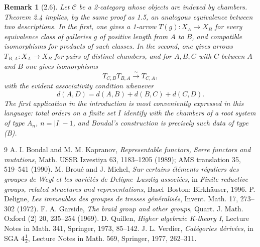 \documentclass[11pt]{article}
\newtheorem{remark}[theorem]{Remark}
\begin{document}
\begin{remark}[2.6]
Let $\mathcal C$ be a 2-category whose objects are indexed by chambers. Theorem 2.4 implies, by the same proof as 1.5, an analogous equivalence between two descriptions. In the first, one gives a 1-arrow $T(g):X_A\to X_B$ for every equivalence class of galleries $g$ of positive length from $A$ to $B$, and compatible isomorphisms for products of such classes. In the second, one gives arrows $T_{B,A}:X_A\to X_B$ for pairs of distinct chambers, and for $A,B,C$ with $C$ between $A$ and $B$ one gives isomorphisms
\[
T_{C,B}T_{B,A}\xrightarrow{\sim}T_{C,A},
\]
with the evident associativity condition whenever
\[
d(A,D)=d(A,B)+d(B,C)+d(C,D).
\]
The first application in the introduction is most conveniently expressed in this language: total orders on a finite set $I$ identify with the chambers of a root system of type $A_n$, $n=|I|-1$, and Bondal's construction is precisely such data of type (B).
\end{remark}

\begin{thebibliography}{9}
 A. I. Bondal and M. M. Kapranov, \emph{Representable functors, Serre functors and mutations}, Math. USSR Izvestiya 63, 1183--1205 (1989); AMS translation 35, 519--541 (1990).
 M. Broué and J. Michel, \emph{Sur certains éléments réguliers des groupes de Weyl et les variétés de Deligne--Lusztig associées}, in \emph{Finite reductive groups, related structures and representations}, Basel--Boston: Birkhäuser, 1996.
 P. Deligne, \emph{Les immeubles des groupes de tresses généralisés}, Invent. Math. 17, 273--302 (1972).
 F. A. Garside, \emph{The braid group and other groups}, Quart. J. Math. Oxford (2) 20, 235--254 (1969).
 D. Quillen, \emph{Higher algebraic K-theory I}, Lecture Notes in Math. 341, Springer, 1973, 85--142.
 J. L. Verdier, \emph{Catégories dérivées}, in SGA $4\frac12$, Lecture Notes in Math. 569, Springer, 1977, 262--311.
\end{thebibliography}
\end{document}
